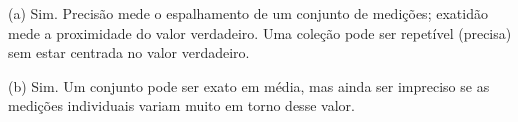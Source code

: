 (a) Sim. Precisão mede o espalhamento de um conjunto de medições; exatidão mede a proximidade do valor verdadeiro. Uma coleção pode ser repetível (precisa) sem estar centrada no valor verdadeiro.

(b) Sim. Um conjunto pode ser exato em média, mas ainda ser impreciso se as medições individuais variam muito em torno desse valor. 